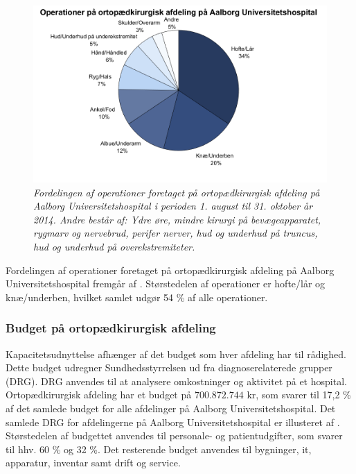 \begin{figure}[H]
	\flushleft 
	\centering
	\includegraphics[scale=0.55]{figures/operationsdiagram.png}
	\flushleft
	\caption{\textit{Fordelingen af operationer foretaget på ortopædkirurgisk afdeling på Aalborg Universitetshospital i perioden 1. august til 31. oktober år 2014. Andre består af: Ydre øre, mindre kirurgi på bevægeapparatet, rygmarv og nervebrud, perifer nerver, hud og underhud på truncus, hud og underhud på overekstremiteter.}}
	\label{operationstype}
\end{figure}

\noindent
Fordelingen af operationer foretaget på ortopædkirurgisk afdeling på Aalborg Universitetshospital fremgår af . Størstedelen af operationer er hofte/lår og knæ/underben, hvilket samlet udgør 54 \% af alle operationer.

\subsubsection{Budget på ortopædkirurgisk afdeling}
Kapacitetsudnyttelse afhænger af det budget som hver afdeling har til rådighed. Dette budget udregner Sundhedsstyrrelsen ud fra diagnoserelaterede grupper (DRG). DRG anvendes til at analysere omkostninger og aktivitet på et hospital.\cite{DRG2016} Ortopædkirurgisk afdeling har et budget på $700.872.744$ kr, som svarer til 17,2 \% af det samlede budget for alle afdelinger på Aalborg Universitetshospital. Det samlede DRG for afdelingerne på Aalborg Universitetshospital er illusteret af .\cite{Rasmussen2016}
Størstedelen af budgettet anvendes til personale- og patientudgifter, som svarer til hhv. 60 \% og 32 \%. Det resterende budget anvendes til bygninger, it, apparatur, inventar samt drift og service\cite{Noegletal2016}. 


